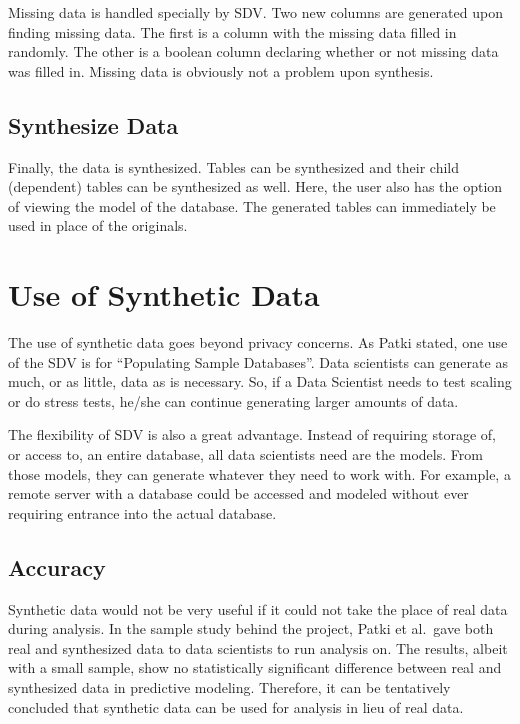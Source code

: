 Missing data is handled specially by SDV. Two new columns are generated
upon finding missing data. The first is a column with the missing data
filled in randomly. The other is a boolean column declaring whether or not
missing data was filled in. Missing data is obviously not a problem upon
synthesis.\cite{patki-wedge-veer-sdv}

\subsection{Synthesize Data}

Finally, the data is synthesized. Tables can be synthesized and their child
(dependent) tables can be synthesized as well. Here, the user also has
the option of viewing the model of the database. The generated tables can
immediately be used in place of the originals.\cite{patki-wedge-veer-sdv}

\section{Use of Synthetic Data}

The use of synthetic data goes beyond privacy concerns. As Patki stated, one
use of the SDV is for ``Populating Sample Databases''\cite{patki-sdv}. Data
scientists can generate as much, or as little, data as is necessary. So,
if a Data Scientist needs to test scaling or do stress tests, he/she can
continue generating larger amounts of data.

The flexibility of SDV is also a great advantage. Instead of requiring
storage of, or access to, an entire database, all data scientists need are
the models. From those models, they can generate whatever they need to work
with. For example, a remote server with a database could be accessed and
modeled without ever requiring entrance into the actual database.

\subsection{Accuracy}

Synthetic data would not be very useful if it could not take the place of
real data during analysis. In the sample study behind the project, Patki et
al.\ gave both real and synthesized data to data scientists to run analysis
on. The results, albeit with a small sample, show no statistically significant
difference between real and synthesized data in predictive modeling. Therefore,
it can be tentatively concluded that synthetic data can be used for analysis
in lieu of real data.\cite{patki-wedge-veer-sdv}

